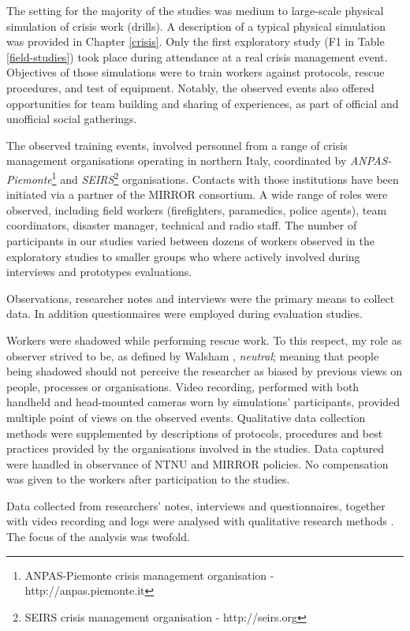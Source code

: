The setting for the majority of the studies was medium to large-scale physical simulation of crisis work (drills). A description of a typical physical simulation was provided in Chapter \ref{crisis}. Only the first exploratory study (F1 in Table \ref{field-studies}) took place during attendance at a real crisis management event. Objectives of those simulations were to train workers against protocols, rescue procedures, and test of equipment. Notably, the observed events also offered opportunities for team building and sharing of experiences, as part of official and unofficial social gatherings.

The observed training events, involved personnel from a range of crisis management organisations operating in northern Italy, coordinated by \emph{ANPAS-Piemonte}\footnote{ANPAS-Piemonte crisis management organisation - http://anpas.piemonte.it} and \emph{SEIRS}\footnote{SEIRS crisis management organisation - http://seirs.org} organisations. Contacts with those institutions have been initiated via a partner of the MIRROR consortium. A wide range of roles were observed, including field workers (firefighters, paramedics, police agents), team coordinators, disaster manager, technical and radio staff. The number of participants in our studies varied between dozens of workers observed in the exploratory studies to smaller groups who where actively involved during interviews and prototypes evaluations.

Observations, researcher notes and interviews were the primary means to collect data. In addition questionnaires were employed during evaluation studies.

Workers were shadowed while performing rescue work. To this respect, my role as observer strived to be, as defined by Walsham \autocite*{Walsham:2006bo}, \emph{neutral}; meaning that people being shadowed should not perceive the researcher as biased by previous views on people, processes or organisations. Video recording, performed with both handheld and head-mounted cameras worn by simulations' participants, provided multiple point of views on the observed events. Qualitative data collection methods were supplemented by descriptions of protocols, procedures and best practices provided by the organisations involved in the studies. Data captured were handled in observance of NTNU and MIRROR policies. No compensation was given to the workers after participation to the studies.

Data collected from researchers' notes, interviews and questionnaires, together with video recording and logs were analysed with qualitative research methods \autocite{robson1993real}. The focus of the analysis was twofold.

